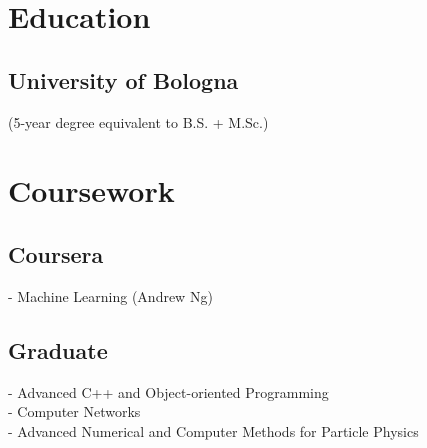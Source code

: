 \documentclass[letterpaper]{deedy-resume} %
\begin{document}
\begin{minipage}[t]{0.29\textwidth}
\sectionspace %



\section{Education} 

\subsection{University of Bologna}


\sectionspace %

\small{(5-year degree equivalent to B.S. + M.Sc.)}\\

\sectionspace %
\sectionspace %


\section{Coursework}

\subsection{Coursera}
- Machine Learning (Andrew Ng) \\

\sectionspace %


\subsection{Graduate}
- Advanced C++ and Object-oriented Programming \\
- Computer Networks \\ 
- Advanced Numerical and Computer Methods for Particle Physics \\

\sectionspace %


\end{minipage}
\end{document}
